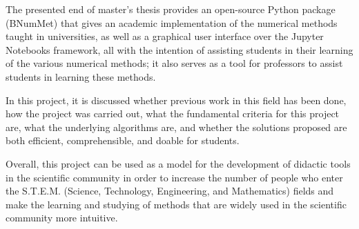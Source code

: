 \newcommand{\KeywordsAbstract}{Numerical methods, Open-source, Python, Jupyter, Software development, Linear systems, Interpolation, Nonlinear, Least squares, Random number generators}

The presented end of master's thesis provides an open-source Python package (BNumMet) that gives an academic implementation of the numerical methods taught in universities, as well as a graphical user interface over the Jupyter Notebooks framework, all with the intention of assisting students in their learning of the various numerical methods; it also serves as a tool for professors to assist students in learning these methods.


In this project, it is discussed whether previous work in this field has been done, how the project was carried out, what the fundamental criteria for this project are, what the underlying algorithms are, and whether the solutions proposed are both efficient, comprehensible, and doable for students.

Overall, this project can be used as a model for the development of didactic tools in the scientific community in order to increase the number of people who enter the S.T.E.M. (Science, Technology, Engineering, and Mathematics) fields and make the learning and studying of methods that are widely used in the scientific community more intuitive. 